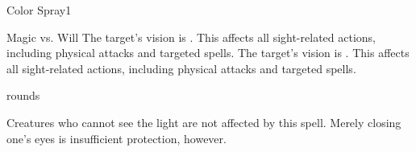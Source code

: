 \begin{spellsection}{Color Spray}{1}
    \begin{spellheader}
    \end{spellheader}
    \begin{spellcontent}
        \begin{spelltargetinginfo}
        \end{spelltargetinginfo}
        \begin{spelleffects}
            \begin{spellattack}{Magic vs. Will}
                \spellsuccess The target's vision is \impaired. This affects all sight-related actions, including physical attacks and targeted spells.
                \spellcritical The target's vision is \severelyimpaired. This affects all sight-related actions, including physical attacks and targeted spells.
            \end{spellattack}
             rounds
        \end{spelleffects}
    \end{spellcontent}
    \begin{spellfooter}
        \spellnotes Creatures who cannot see the light are not affected by this spell. Merely closing one's eyes is insufficient protection, however.
        \miscastexplode
    \end{spellfooter}
\end{spellsection}

